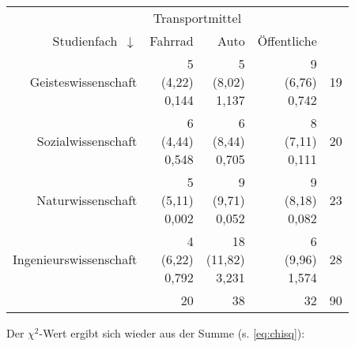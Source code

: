 \documentclass[
  ngerman,
]{article}
\begin{document}
\begin{table}
\centering
\begin{tabular}{>{}r|rr>{}r|r}
\toprule
\multicolumn{1}{c}{ } & \multicolumn{2}{c}{Transportmittel} & \multicolumn{1}{c}{ } \\
Studienfach~$\downarrow$ & Fahrrad & Auto & Öffentliche & \\
\midrule
Geisteswissenschaft & \makecell[tr]{5\\(4,22)\\\textcolor{goethe_blue}{0,144}} & \makecell[tr]{5\\(8,02)\\\textcolor{goethe_blue}{1,137}} & \makecell[tr]{9\\(6,76)\\\textcolor{goethe_blue}{0,742}} & 19\\
Sozialwissenschaft & \makecell[tr]{6\\(4,44)\\\textcolor{goethe_blue}{0,548}} & \makecell[tr]{6\\(8,44)\\\textcolor{goethe_blue}{0,705}} & \makecell[tr]{8\\(7,11)\\\textcolor{goethe_blue}{0,111}} & 20\\
Naturwissenschaft & \makecell[tr]{5\\(5,11)\\\textcolor{goethe_blue}{0,002}} & \makecell[tr]{9\\(9,71)\\\textcolor{goethe_blue}{0,052}} & \makecell[tr]{9\\(8,18)\\\textcolor{goethe_blue}{0,082}} & 23\\
Ingenieurswissenschaft & \makecell[tr]{4\\(6,22)\\\textcolor{goethe_blue}{0,792}} & \makecell[tr]{18\\(11,82)\\\textcolor{goethe_blue}{3,231}} & \makecell[tr]{6\\(9,96)\\\textcolor{goethe_blue}{1,574}} & 28\\
\midrule
 & 20 & 38 & 32 & 90\\
\bottomrule
\end{tabular}
\end{table}

Der \(\chi^2\)-Wert ergibt sich wieder aus der Summe (s. \autoref{eq:chisq}):
\end{document}
